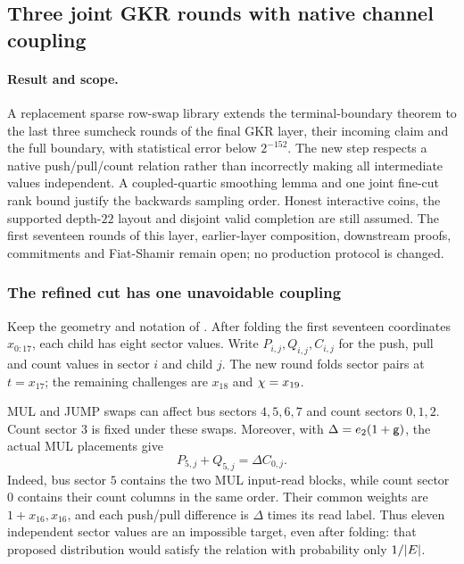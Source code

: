 \subsection{Three joint GKR rounds with native channel coupling}\label{note:zk-three-round-tail}

\paragraph{Result and scope.} A replacement sparse row-swap library extends the terminal-boundary theorem to the last three sumcheck rounds of the final GKR layer, their incoming claim and the full boundary, with statistical error below $2^{-152}$. The new step respects a native push/pull/count relation rather than incorrectly making all intermediate values independent. A coupled-quartic smoothing lemma and one joint fine-cut rank bound justify the backwards sampling order. Honest interactive coins, the supported depth-$22$ layout and disjoint valid completion are still assumed. The first seventeen rounds of this layer, earlier-layer composition, downstream proofs, commitments and Fiat-Shamir remain open; no production protocol is changed.

\subsubsection{The refined cut has one unavoidable coupling}

Keep the geometry and notation of . After folding the first seventeen coordinates $x_{0:17}$, each child has eight sector values. Write $P_{i,j},Q_{i,j},C_{i,j}$ for the push, pull and count values in sector $i$ and child $j$. The new round folds sector pairs at $t=x_{17}$; the remaining challenges are $x_{18}$ and $\chi=x_{19}$.

MUL and JUMP swaps can affect bus sectors $4,5,6,7$ and count sectors $0,1,2$. Count sector $3$ is fixed under these swaps. Moreover, with $\Delta=e_2(1+\mathsf{g})$, the actual MUL placements give
\[
 P_{5,j}+Q_{5,j}=\Delta C_{0,j}.
\]
Indeed, bus sector $5$ contains the two MUL input-read blocks, while count sector $0$ contains their count columns in the same order. Their common weights are $1+x_{16},x_{16}$, and each push/pull difference is $\Delta$ times its read label. Thus eleven independent sector values are an impossible target, even after folding: that proposed distribution would satisfy the relation with probability only $1/|E|$.

